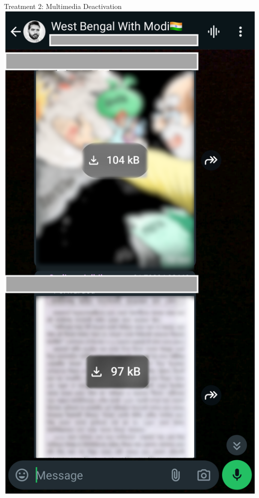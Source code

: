 \documentclass[usenames,dvipsnames,t]{beamer}
\begin{document}
\begin{frame}{Treatment 2: Multimedia Deactivation}
{\centering\includegraphics[scale=.35]{ss_tmedia_examplereal_dlpre}
}




\end{frame}
\end{document}
